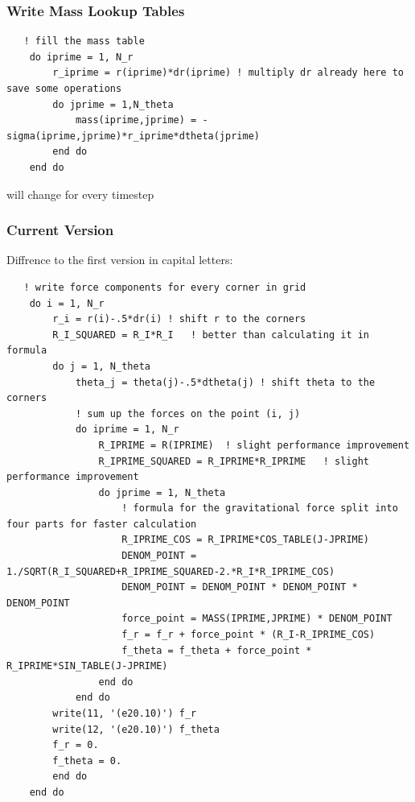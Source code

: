 \documentclass{beamer}
\begin{document}
\begin{frame}[fragile]
  \frametitle{Write Mass Lookup Tables}
  \begin{lstlisting}
   ! fill the mass table
    do iprime = 1, N_r
        r_iprime = r(iprime)*dr(iprime) ! multiply dr already here to save some operations
        do jprime = 1,N_theta
            mass(iprime,jprime) = -sigma(iprime,jprime)*r_iprime*dtheta(jprime)
        end do
    end do
  \end{lstlisting}
  
  will change for every timestep

\end{frame}
\begin{frame}[fragile]
 \frametitle{Current Version}
  Diffrence to the first version in capital letters:
  \begin{lstlisting}
   ! write force components for every corner in grid
    do i = 1, N_r
        r_i = r(i)-.5*dr(i) ! shift r to the corners
        R_I_SQUARED = R_I*R_I   ! better than calculating it in formula
        do j = 1, N_theta
            theta_j = theta(j)-.5*dtheta(j) ! shift theta to the corners
            ! sum up the forces on the point (i, j)
            do iprime = 1, N_r
                R_IPRIME = R(IPRIME)  ! slight performance improvement
                R_IPRIME_SQUARED = R_IPRIME*R_IPRIME   ! slight performance improvement
                do jprime = 1, N_theta
                    ! formula for the gravitational force split into four parts for faster calculation
                    R_IPRIME_COS = R_IPRIME*COS_TABLE(J-JPRIME)
                    DENOM_POINT = 1./SQRT(R_I_SQUARED+R_IPRIME_SQUARED-2.*R_I*R_IPRIME_COS)
                    DENOM_POINT = DENOM_POINT * DENOM_POINT * DENOM_POINT
                    force_point = MASS(IPRIME,JPRIME) * DENOM_POINT
                    f_r = f_r + force_point * (R_I-R_IPRIME_COS)
                    f_theta = f_theta + force_point * R_IPRIME*SIN_TABLE(J-JPRIME)
                end do
            end do
        write(11, '(e20.10)') f_r
        write(12, '(e20.10)') f_theta
        f_r = 0.
        f_theta = 0.
        end do
    end do
  \end{lstlisting}

\end{frame}
\end{document}
